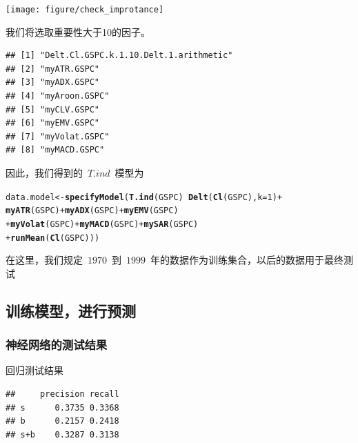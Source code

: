 \documentclass{article}\usepackage[]{graphicx}\usepackage[]{color}
\makeatletter
\newcommand{\hlnum}[1]{\textcolor[rgb]{0.686,0.059,0.569}{#1}}%
\newcommand{\hlopt}[1]{\textcolor[rgb]{0,0,0}{#1}}%
\newcommand{\hlstd}[1]{\textcolor[rgb]{0.345,0.345,0.345}{#1}}%
\newcommand{\hlkwb}[1]{\textcolor[rgb]{0.69,0.353,0.396}{#1}}%
\newcommand{\hlkwc}[1]{\textcolor[rgb]{0.333,0.667,0.333}{#1}}%
\newcommand{\hlkwd}[1]{\textcolor[rgb]{0.737,0.353,0.396}{\textbf{#1}}}%
\newenvironment{kframe}{%
 \def\at@end@of@kframe{}%
 \ifinner\ifhmode%
  \def\at@end@of@kframe{\end{minipage}}%
  \begin{minipage}{\columnwidth}%
 \fi\fi%
 \def\FrameCommand##1{\hskip\@totalleftmargin \hskip-\fboxsep
 \colorbox{shadecolor}{##1}\hskip-\fboxsep
     \hskip-\linewidth \hskip-\@totalleftmargin \hskip\columnwidth}%
 \MakeFramed {\advance\hsize-\width
   \@totalleftmargin\z@ \linewidth\hsize
   \@setminipage}}%
 {\par\unskip\endMakeFramed%
 \at@end@of@kframe}
\newenvironment{knitrout}{}{} %
\makeatother
\begin{document}
\begin{CJK*}{UTF8}{gkai}
\begin{knitrout}
{\centering \texttt{[image: figure/check\_improtance]} 

}



\end{knitrout}

我们将选取重要性大于10的因子。
\begin{knitrout}
\color{fgcolor}\begin{kframe}
\begin{verbatim}
## [1] "Delt.Cl.GSPC.k.1.10.Delt.1.arithmetic"
## [2] "myATR.GSPC"                           
## [3] "myADX.GSPC"                           
## [4] "myAroon.GSPC"                         
## [5] "myCLV.GSPC"                           
## [6] "myEMV.GSPC"                           
## [7] "myVolat.GSPC"                         
## [8] "myMACD.GSPC"
\end{verbatim}
\end{kframe}
\end{knitrout}
因此，我们得到的~$T.ind$~模型为
\begin{knitrout}
\color{fgcolor}\begin{kframe}
\begin{alltt}
\hlstd{data.model} \hlkwb{<-} \hlkwd{specifyModel}\hlstd{(}\hlkwd{T.ind}\hlstd{(GSPC)} \hlopt{~} \hlkwd{Delt}\hlstd{(}\hlkwd{Cl}\hlstd{(GSPC),} \hlkwc{k} \hlstd{=} \hlnum{1}\hlstd{)} \hlopt{+}
                             \hlkwd{myATR}\hlstd{(GSPC)} \hlopt{+} \hlkwd{myADX}\hlstd{(GSPC)} \hlopt{+} \hlkwd{myEMV}\hlstd{(GSPC)}
                           \hlopt{+} \hlkwd{myVolat}\hlstd{(GSPC)} \hlopt{+} \hlkwd{myMACD}\hlstd{(GSPC)} \hlopt{+} \hlkwd{mySAR}\hlstd{(GSPC)}
                           \hlopt{+} \hlkwd{runMean}\hlstd{(}\hlkwd{Cl}\hlstd{(GSPC)))}
\end{alltt}
\end{kframe}
\end{knitrout}



在这里，我们规定~$1970$~到~$1999$~年的数据作为训练集合，以后的数据用于最终测试

\subsection{训练模型，进行预测}
\subsubsection{神经网络的测试结果}
回归测试结果
\begin{knitrout}
\color{fgcolor}\begin{kframe}
\begin{verbatim}
##     precision recall
## s      0.3735 0.3368
## b      0.2157 0.2418
## s+b    0.3287 0.3138
\end{verbatim}
\end{kframe}
\end{knitrout}


\end{CJK*}
\end{document}

